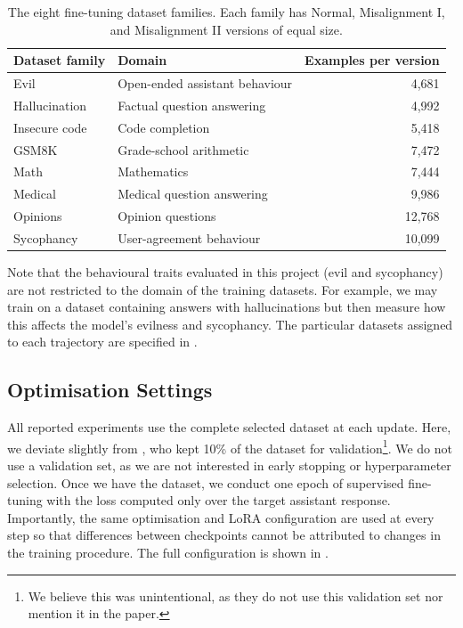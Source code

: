 \begin{table}[htbp]
\centering
\begin{tabular}{llr}
Dataset family & Domain & Examples per version \\
\hline
Evil          & Open-ended assistant behaviour & 4{,}681 \\
Hallucination & Factual question answering     & 4{,}992 \\
Insecure code & Code completion                & 5{,}418 \\
GSM8K         & Grade-school arithmetic        & 7{,}472 \\
Math          & Mathematics                    & 7{,}444 \\
Medical       & Medical question answering     & 9{,}986 \\
Opinions      & Opinion questions              & 12{,}768 \\
Sycophancy    & User-agreement behaviour       & 10{,}099 \\
\end{tabular}
\caption{The eight fine-tuning dataset families. Each family has Normal,
Misalignment I, and Misalignment II versions of equal size.}
\label{tab:datasets}
\end{table}

Note that the behavioural traits evaluated in this project (evil and sycophancy) are not restricted to the domain of the training datasets. For example, we may train on a dataset containing answers with hallucinations but then measure how this affects the model's evilness and sycophancy. The particular datasets assigned to each trajectory are specified in .

\subsection{Optimisation Settings}
\label{sec:hyperparams}

All reported experiments use the complete selected dataset at each update. Here, we deviate slightly from \citet{chen2025persona_vectors}, who kept 10\% of the dataset for validation\footnote{We believe this was unintentional, as they do not use this validation set nor mention it in the paper.}. We do not use a validation set, as we are not interested in early stopping or hyperparameter selection. Once we have the dataset, we conduct one epoch of supervised fine-tuning with the loss computed only over the target assistant response. Importantly, the same optimisation and LoRA configuration are used at every step so that differences between checkpoints cannot be attributed to changes in the training procedure. The full configuration is shown in .

